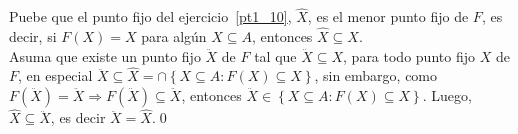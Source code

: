 \item Puebe que el punto fijo del ejercicio~\ref{pt1_10}, \(\hat{X}\), es el menor punto fijo de \(F\), 
    es decir, si \(F(X) = X\) para algún \(X \subseteq A\), entonces \(\hat{X} \subseteq X\). \\
    Asuma que existe un punto fijo \(\ddot{X}\) de \(F\) tal que \(\ddot{X} \subseteq X\), para todo punto fijo \(X\) de \(F\),
    en especial \(\ddot{X} \subseteq \hat{X} = \cap\left\{X \subseteq A: F(X) \subseteq X\right\}\), sin embargo, 
    como \(F(\ddot{X}) = \ddot{X} \Rightarrow F(\ddot{X}) \subseteq \ddot{X}\), entonces \(\ddot{X} \in \left\{X \subseteq A: F(X) \subseteq X\right\}\).
    Luego, \(\hat{X} \subseteq \ddot{X}\), es decir \(\ddot{X} = \hat{X}\).\qed{}


